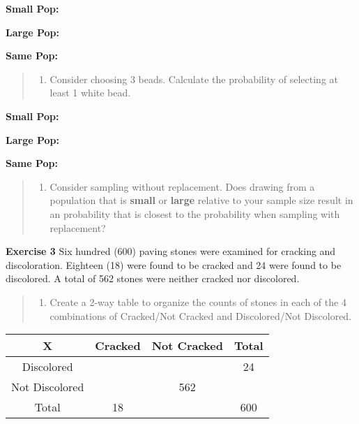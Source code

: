 \documentclass[
]{article}
\providecommand{\tightlist}{%
  \setlength{\itemsep}{0pt}\setlength{\parskip}{0pt}}
\begin{document}
\textbf{Small Pop: }

\textbf{Large Pop: }

\textbf{Same Pop: }

\begin{quote}
\begin{enumerate}
\def\labelenumi{\alph{enumi}.}
\setcounter{enumi}{1}
\tightlist
\item
  Consider choosing 3 beads. Calculate the probability of selecting at
  least 1 white bead.
\end{enumerate}
\end{quote}

\textbf{Small Pop: }

\textbf{Large Pop: }

\textbf{Same Pop: }

\begin{quote}
\begin{enumerate}
\def\labelenumi{\alph{enumi}.}
\setcounter{enumi}{2}
\tightlist
\item
  Consider sampling without replacement. Does drawing from a population
  that is \textbf{small} or \textbf{large} relative to your sample size
  result in an probability that is closest to the probability when
  sampling with replacement?
\end{enumerate}
\end{quote}

\vspace{.5cm}

\textbf{Exercise 3} Six hundred (600) paving stones were examined for
cracking and discoloration. Eighteen (18) were found to be cracked and
24 were found to be discolored. A total of 562 stones were neither
cracked nor discolored.

\begin{quote}
\begin{enumerate}
\def\labelenumi{\alph{enumi}.}
\tightlist
\item
  Create a 2-way table to organize the counts of stones in each of the 4
  combinations of Cracked/Not Cracked and Discolored/Not Discolored.
\end{enumerate}
\end{quote}

\begin{longtable}[]{@{}cccc@{}}
\toprule()
X & Cracked & Not Cracked & Total \\
\midrule()
\endhead
Discolored & & & 24 \\
Not Discolored & & 562 & \\
Total & 18 & & 600 \\
\bottomrule()
\end{longtable}
\end{document}
